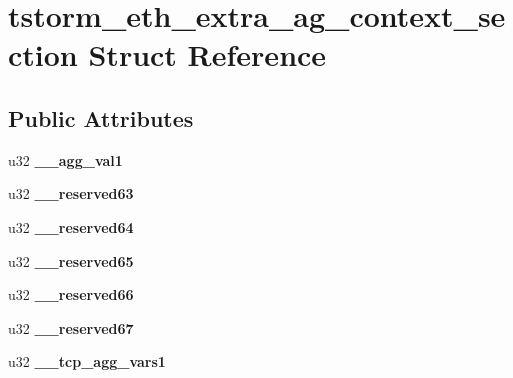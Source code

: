 \hypertarget{structtstorm__eth__extra__ag__context__section}{
\section{tstorm\_\-eth\_\-extra\_\-ag\_\-context\_\-section Struct Reference}
\label{structtstorm__eth__extra__ag__context__section}
}
\subsection*{Public Attributes}
\begin{DoxyCompactItemize}
\item 
\hypertarget{structtstorm__eth__extra__ag__context__section_a6e2e8f26599c043c8bd08af364148c95}{
u32 {\bfseries \_\-\_\-agg\_\-val1}}
\label{structtstorm__eth__extra__ag__context__section_a6e2e8f26599c043c8bd08af364148c95}

\item 
\hypertarget{structtstorm__eth__extra__ag__context__section_a9839c533f1ac74fb547c8d2ac528dbe8}{
u32 {\bfseries \_\-\_\-reserved63}}
\label{structtstorm__eth__extra__ag__context__section_a9839c533f1ac74fb547c8d2ac528dbe8}

\item 
\hypertarget{structtstorm__eth__extra__ag__context__section_aff2310c098cab0819e23523eac3638f8}{
u32 {\bfseries \_\-\_\-reserved64}}
\label{structtstorm__eth__extra__ag__context__section_aff2310c098cab0819e23523eac3638f8}

\item 
\hypertarget{structtstorm__eth__extra__ag__context__section_a186fee7b1e83c5027616931e7a2f3ae0}{
u32 {\bfseries \_\-\_\-reserved65}}
\label{structtstorm__eth__extra__ag__context__section_a186fee7b1e83c5027616931e7a2f3ae0}

\item 
\hypertarget{structtstorm__eth__extra__ag__context__section_a082bf515fdbc1e2f5719a4d1546c9c82}{
u32 {\bfseries \_\-\_\-reserved66}}
\label{structtstorm__eth__extra__ag__context__section_a082bf515fdbc1e2f5719a4d1546c9c82}

\item 
\hypertarget{structtstorm__eth__extra__ag__context__section_a2acfc1ebcb8e8cc620dca51059420b80}{
u32 {\bfseries \_\-\_\-reserved67}}
\label{structtstorm__eth__extra__ag__context__section_a2acfc1ebcb8e8cc620dca51059420b80}

\item 
\hypertarget{structtstorm__eth__extra__ag__context__section_a8ebcd743f9124eee3d64b5fe973a3734}{
u32 {\bfseries \_\-\_\-tcp\_\-agg\_\-vars1}}
\label{structtstorm__eth__extra__ag__context__section_a8ebcd743f9124eee3d64b5fe973a3734}


\end{DoxyCompactItemize}
